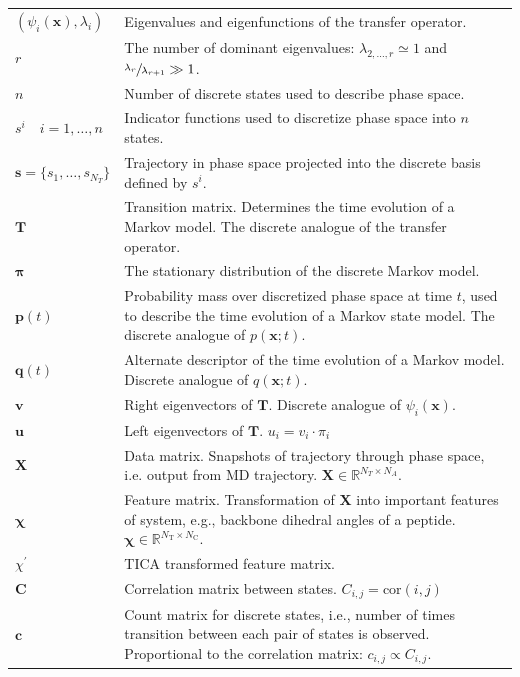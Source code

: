 \begin{table}
\begin{tabularx}{0.9\textwidth}{ |l| >{\raggedright\arraybackslash}X | }
        $(\psi_{i}(\mathbf{x}), \lambda_{i})$ & Eigenvalues and eigenfunctions of the transfer operator.  \\
        $r$ & The number of dominant eigenvalues: $\lambda_{2,\ldots, r}\simeq 1$ and $\sfrac{\lambda_{r}}{\lambda_{r+1}} \gg 1$. \\
        $n$ & Number of discrete states used to describe phase space.\\
        $s^{i}\quad i = 1, \ldots, n$ & Indicator functions used to discretize phase space into $n$ states.  \\
        $\mathbf{s} = \{s_{1}, \ldots, s_{N_{T}}\} $ & Trajectory in phase space projected into the discrete basis defined by $s^{i}$. \\
        $\mathbf{T}$ & Transition matrix. Determines the time evolution of a Markov model. The discrete analogue of the transfer operator. \\
        $\bm{\pi}$ & The stationary distribution of the discrete Markov model. \\
        $\mathbf{p}(t)$ & Probability mass over discretized phase space at time $t$, used to describe the time evolution of a Markov state model. The discrete analogue of $p(\mathbf{x}; t)$. \\
        $\mathbf{q}(t)$ & Alternate descriptor of the time evolution of a Markov model. Discrete analogue of $q(\mathbf{x};t)$. \\
        $\mathbf{v}$ & Right eigenvectors of $\mathbf{T}$. Discrete analogue of $\psi_{i}(\mathbf{x})$. \\
        $\mathbf{u}$ & Left eigenvectors of $\mathbf{T}$. $u_{i} = v_{i}\cdot\pi_{i}$ \\
        $\mathbf{X}$ & Data matrix. Snapshots of trajectory through phase space, i.e. output from MD trajectory. $\mathbf{X}\in \mathbb{R}^{N_{T}\times N_{A}}$.\\
        $\bm{\chi}$ & Feature matrix. Transformation of $\mathbf{X}$ into important features of system, e.g., backbone dihedral angles of a peptide. $\bm{\chi} \in \mathbb{R}^{N_{\mathrm{T}}\times N_{\mathrm{C}}}$. \\
        $\chi^{\prime}$ & TICA transformed feature matrix. \\
        $\mathbf{C}$ & Correlation matrix between states. $C_{i,j} = \mathrm{cor}(i, j)$  \\
        $\mathbf{c}$ & Count matrix for discrete states, i.e., number of times transition between each pair of states is observed. Proportional to the correlation matrix: $c_{i,j} \propto C_{i,j}$. \\

\end{tabularx}
\end{table}
